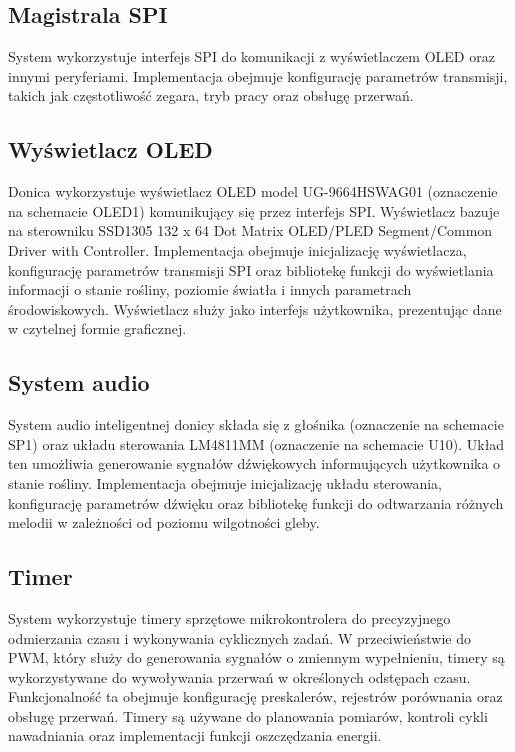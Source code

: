 \documentclass{article}
\begin{document}
\subsection{Magistrala SPI}
System wykorzystuje interfejs SPI do komunikacji z wyświetlaczem OLED oraz innymi peryferiami. Implementacja obejmuje konfigurację parametrów transmisji, takich jak częstotliwość zegara, tryb pracy oraz obsługę przerwań.

\subsection{Wyświetlacz OLED}
Donica wykorzystuje wyświetlacz OLED model UG-9664HSWAG01 (oznaczenie na schemacie OLED1) komunikujący się przez interfejs SPI. Wyświetlacz bazuje na sterowniku SSD1305 132 x 64 Dot Matrix OLED/PLED Segment/Common Driver with Controller. Implementacja obejmuje inicjalizację wyświetlacza, konfigurację parametrów transmisji SPI oraz bibliotekę funkcji do wyświetlania informacji o stanie rośliny, poziomie światła i innych parametrach środowiskowych. Wyświetlacz służy jako interfejs użytkownika, prezentując dane w czytelnej formie graficznej.

\subsection{System audio}
System audio inteligentnej donicy składa się z głośnika (oznaczenie na schemacie SP1) oraz układu sterowania LM4811MM (oznaczenie na schemacie U10). Układ ten umożliwia generowanie sygnałów dźwiękowych informujących użytkownika o stanie rośliny. Implementacja obejmuje inicjalizację układu sterowania, konfigurację parametrów dźwięku oraz bibliotekę funkcji do odtwarzania różnych melodii w zależności od poziomu wilgotności gleby.


\subsection{Timer}
System wykorzystuje timery sprzętowe mikrokontrolera do precyzyjnego odmierzania czasu i wykonywania cyklicznych zadań. W przeciwieństwie do PWM, który służy do generowania sygnałów o zmiennym wypełnieniu, timery są wykorzystywane do wywoływania przerwań w określonych odstępach czasu. Funkcjonalność ta obejmuje konfigurację preskalerów, rejestrów porównania oraz obsługę przerwań. Timery są używane do planowania pomiarów, kontroli cykli nawadniania oraz implementacji funkcji oszczędzania energii.
\end{document}

